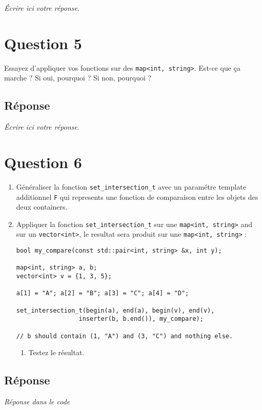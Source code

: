 \documentclass{article}
\begin{document}
\emph{Écrire ici votre réponse}. 


\section*{Question 5}
\label{sec:org25de977}

Essayez d'appliquer vos fonctions sur des \texttt{map<int, string>}. 
Est-ce que ça marche ? Si oui, pourquoi ? Si non, pourquoi ?

\subsection*{Réponse}
\label{sec:org739e169}

\emph{Écrire ici votre réponse}. 


\section*{Question 6}
\label{sec:org211b09c}

\begin{enumerate}
\item Généraliser la fonction \texttt{set\_intersection\_t} avec un paramétre
template additionnel \texttt{F} qui represents une fonction de
comparaison entre les objets des deux containers.

\item Appliquer la fonction \texttt{set\_intersection\_t} sur une \texttt{map<int,
     string>} and sur un \texttt{vector<int>}, le resultat sera produit sur
une \texttt{map<int, string>} :

\begin{verbatim}
bool my_compare(const std::pair<int, string> &x, int y);

map<int, string> a, b;
vector<int> v = {1, 3, 5};

a[1] = "A"; a[2] = "B"; a[3] = "C"; a[4] = "D";

set_intersection_t(begin(a), end(a), begin(v), end(v), 
                 inserter(b, b.end()), my_compare); 

// b should contain (1, "A") and (3, "C") and nothing else. 
\end{verbatim}

\begin{enumerate}
\item Testez le résultat.
\end{enumerate}
\end{enumerate}


\subsection*{Réponse}
\label{sec:org3499c4b}

\emph{Réponse dans le code} 
\end{document}
